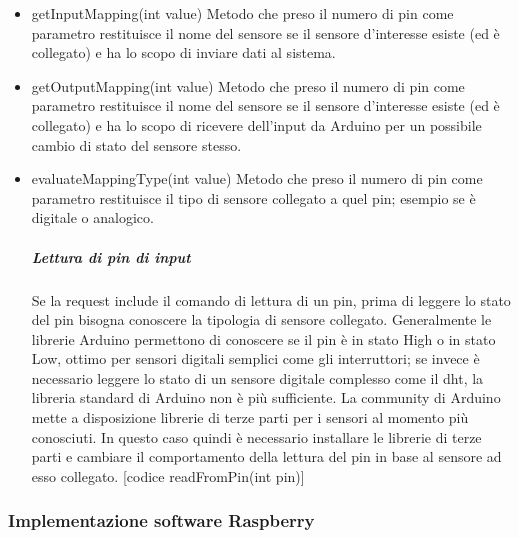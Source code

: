 \documentclass[12pt]{article}
\begin{document}
\begin{itemize}
\item getInputMapping(int value) Metodo che preso il numero di pin come parametro restituisce il nome del sensore se il sensore d'interesse esiste (ed è collegato) e ha lo scopo di inviare dati al sistema.
\item getOutputMapping(int value) Metodo che preso il numero di pin come parametro restituisce il nome del sensore se il sensore d'interesse esiste (ed è collegato) e ha lo scopo di ricevere dell'input da Arduino per un possibile cambio di stato del sensore stesso.
\item evaluateMappingType(int value) Metodo che preso il numero di pin come parametro restituisce il tipo di sensore collegato a quel pin; esempio se è digitale o analogico.
\subparagraph{Lettura di pin di input}
Se la request include il comando di lettura di un pin, prima di leggere lo stato del pin bisogna conoscere la tipologia di sensore collegato. Generalmente le librerie Arduino permettono di conoscere se il pin è in stato High o in stato Low, ottimo per sensori digitali semplici come gli interruttori; se invece è necessario leggere lo stato di un sensore digitale complesso come il dht, la libreria standard di Arduino non è più sufficiente. La community di Arduino mette a disposizione librerie di terze parti per i sensori al momento più conosciuti. In questo caso quindi è necessario installare le librerie di terze parti e cambiare il comportamento della lettura del pin in base al sensore ad esso collegato. [codice readFromPin(int pin)]
\end{itemize}
\subsubsection{Implementazione software Raspberry}
\end{document}
